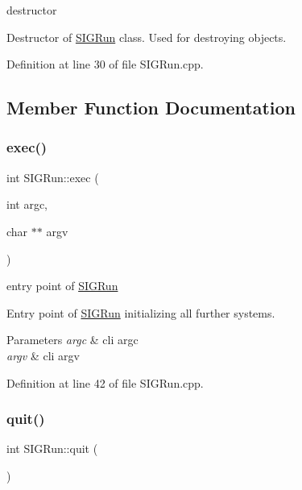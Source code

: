 destructor 

Destructor of \mbox{\hyperlink{class_s_i_g_run}{S\+I\+G\+Run}} class. Used for destroying objects. 

Definition at line 30 of file S\+I\+G\+Run.\+cpp.



\subsection{Member Function Documentation}
\mbox{\label{class_s_i_g_run_a26887ac64836e80c0b7eaaaeff0f6d14}} 
\subsubsection{\texorpdfstring{exec()}{exec()}}
{\footnotesize\ttfamily int S\+I\+G\+Run\+::exec (\begin{DoxyParamCaption}\item[{int}]{argc,  }\item[{char $\ast$$\ast$}]{argv }\end{DoxyParamCaption})}



entry point of \mbox{\hyperlink{class_s_i_g_run}{S\+I\+G\+Run}} 

Entry point of \mbox{\hyperlink{class_s_i_g_run}{S\+I\+G\+Run}} initializing all further systems. 
\begin{DoxyParams}{Parameters}
{\em argc} & cli argc \\
\hline
{\em argv} & cli argv \\
\hline
\end{DoxyParams}


Definition at line 42 of file S\+I\+G\+Run.\+cpp.

\mbox{\label{class_s_i_g_run_ab650777985ff7f5784bf59f1cdf370f5}} 
\subsubsection{\texorpdfstring{quit()}{quit()}}
{\footnotesize\ttfamily int S\+I\+G\+Run\+::quit (\begin{DoxyParamCaption}{ }\end{DoxyParamCaption})\hspace{0.3cm}{\ttfamily [static]}}



